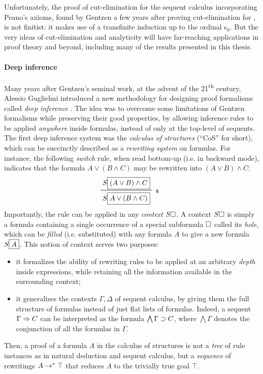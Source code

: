 Unfortunately, the proof of cut-elimination for the sequent calculus
incorporating Peano's axioms, found by Gentzen a few years after proving
cut-elimination for  , is
not finitist: it makes use of a transfinite induction up to the ordinal
$\epsilon_0$. But the very ideas of cut-elimination and analyticity will have
far-reaching applications in proof theory and beyond, including many of the
results presented in this thesis.

\paragraph{Deep inference}

Many years after Gentzen's seminal work, at the advent of the
21\textsuperscript{th} century, Alessio Guglielmi introduced a new methodology
for designing proof formalisms called \emph{deep inference}
. The idea was to overcome some limitations of
Gentzen formalisms while preserving their good properties, by allowing inference
rules to be applied \emph{anywhere} inside formulas, instead of only at the
top-level of sequents. The
first deep inference system was the \emph{calculus of structures} (``CoS'' for
short), which can be succinctly described as a \emph{rewriting system} on
formulas. For instance, the following \emph{switch} rule, when read bottom-up
(i.e. in backward mode), indicates that the formula $A \lor (B \land C)$ may be
rewritten into $(A \lor B) \land C$:
$$\R[\rsf{s}]{S\select{(A \lor B) \land C}}{S\select{A \lor (B \land C)}}$$
Importantly, the rule can be applied in any \emph{context} $S\square$. A context
$S\square$ is simply a formula containing a single occurrence of a special
subformula $\square$ called its \emph{hole}, which can be \emph{filled} (i.e.
substituted) with any formula $A$ to give a new formula $S\fbox{$A$}$. This
notion of context serves two purposes:
\begin{itemize}
  \item it formalizes the ability of rewriting rules to be applied at an
  arbitrary \emph{depth} inside expressions, while retaining all the information
  available in the surrounding context;
  \item it generalizes the contexts $\Gamma, \Delta$ of sequent calculus, by
  giving them the full structure of formulas instead of just flat lists of
  formulas. Indeed, a sequent $\Gamma \Rightarrow C$ can be interpreted as the formula
  $\bigwedge \Gamma \supset C$, where $\bigwedge \Gamma$ denotes the conjunction
  of all the formulas in $\Gamma$.
\end{itemize}
Then, a proof of a formula $A$ in the calculus of structures is not a
\emph{tree} of rule instances as in natural deduction and sequent calculus, but
a \emph{sequence} of rewritings $A \rightarrow^\ast \top$ that reduces $A$ to the
trivially true goal $\top$.

